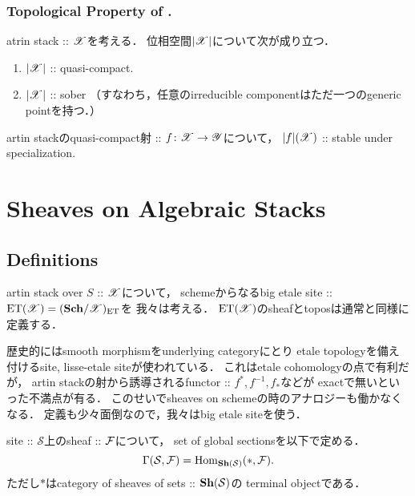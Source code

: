 \documentclass[a4paper, dvipdfmx]{jsarticle}
\begin{document}
\subsubsection{Topological Property of .}
\begin{Prop}
    atrin stack :: $\mathscr{X}$を考える．
    位相空間$|\mathscr{X}|$について次が成り立つ．
    \begin{enumerate}
        \item $|\mathscr{X}|$ :: quasi-compact.
        \item $|\mathscr{X}|$ :: sober
            （すなわち，任意のirreducible componentはただ一つのgeneric pointを持つ．）
    \end{enumerate}
\end{Prop}

\begin{Prop}
    artin stackのquasi-compact射 :: $f \colon \mathscr{X} \to \mathscr{Y}$について，
    $|f|(\mathscr{X})$ :: stable under specialization.
\end{Prop}

\section{Sheaves on Algebraic Stacks}

\subsection{Definitions}
artin stack over $S$ :: $\mathscr{X}$について，
schemeからなるbig etale site :: $\mathrm{ET}(\mathscr{X})=(\mathbf{Sch}/\mathscr{X})_{\mathrm{ET}}$を
我々は考える．
$\mathrm{ET}(\mathscr{X})$のsheafとtoposは通常と同様に定義する．

\begin{Remark}
    歴史的にはsmooth morphismをunderlying categoryにとり
    etale topologyを備え付けるsite, lisse-etale siteが使われている．
    これはetale cohomologyの点で有利だが，
    artin stackの射から誘導されるfunctor :: $f^*, f^{-1}, f_*$などが
    exactで無いといった不満点が有る．
    このせいでsheaves on schemeの時のアナロジーも働かなくなる．
    定義も少々面倒なので，我々はbig etale siteを使う．
\end{Remark}

\begin{Def}
    site :: $\mathcal{S}$上のsheaf :: $\mathcal{F}$について，
    set of global sectionsを以下で定める．
    \[ \Gamma(\mathcal{S}, \mathcal{F})=\operatorname{Hom}_{\mathbf{Sh}(\mathcal{S})}(*, \mathcal{F}). \]
    ただし$*$はcategory of sheaves of sets :: $\mathbf{Sh}(\mathcal{S})$の
    terminal objectである．
\end{Def}
\end{document}
